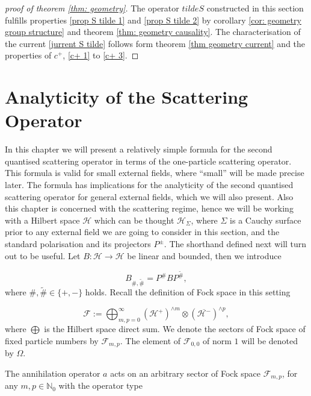\documentclass[b5paper,draft,openbib,12pt]{memoir}
\begin{document}
\begin{proof}[proof of theorem \ref{thm: geometry}]
  The operator \(tilde{S}\) constructed in this section 
  fulfills properties \eqref{prop S tilde 1} and 
  \eqref{prop S tilde 2} by corollary \ref{cor: geometry group structure}
  and theorem \ref{thm: geometry causality}. The characterisation 
  of the current \eqref{jurrent S tilde} follows form 
  theorem \ref{thm geometry current} and the properties of 
  \(c^+\), \eqref{c+ 1} to \eqref{c+ 3}.
\end{proof}


\section[Analyticity of the Scattering Operator][Analyticity]{Analyticity of the Scattering Operator}
In this chapter we will present a relatively simple 
formula for the second quantised scattering operator 
in terms of the one-particle scattering operator. 
This formula is valid for small external fields, where 
``small'' will be made precise later. The formula has 
implications for the analyticity of the second quantised 
scattering operator for general external fields, which 
we will also present. Also this chapter is concerned 
with the scattering regime, hence we will be working 
with a Hilbert space \(\mathcal{H}\) which can be 
thought \(\mathcal{H}_{\Sigma}\), where \(\Sigma\)
is a Cauchy surface prior to any external field 
we are going to consider in this section, and 
the standard polarisation and its projectors 
\(P^\pm\). The shorthand defined next will turn out 
to be useful. Let \(B:\mathcal{H}\rightarrow \mathcal{H}\)
be linear and bounded, then we introduce 

\begin{equation}
  B_{\#,\tilde{\#}}=P^{\#}B P^{\tilde{\#}},
\end{equation}
where \(\#,\tilde{\#}\in \{+,-\}\) holds.
Recall the definition of Fock space in this setting 

\begin{equation}
  \mathcal{F}:=\bigoplus_{m,p=0}^\infty \left(\mathcal{H}^+ \right)^{\wedge m} \otimes \left(\overline{\mathcal{H}^- }\right)^{\wedge p},
\end{equation}
where \(\bigoplus\) is the Hilbert space direct sum. 
We denote the sectors of Fock space of fixed particle
numbers by \(\mathcal{F}_{m,p}\). The element of
\(\mathcal{F}_{0,0}\) of norm \(1\) will be 
denoted by \(\Omega\).

The
annihilation operator \(a\) acts on an arbitrary sector of Fock space
\(\mathcal{F}_{m,p}\), for any \(m,p\in\mathbb{N}_0\) with the operator type
\end{document}
